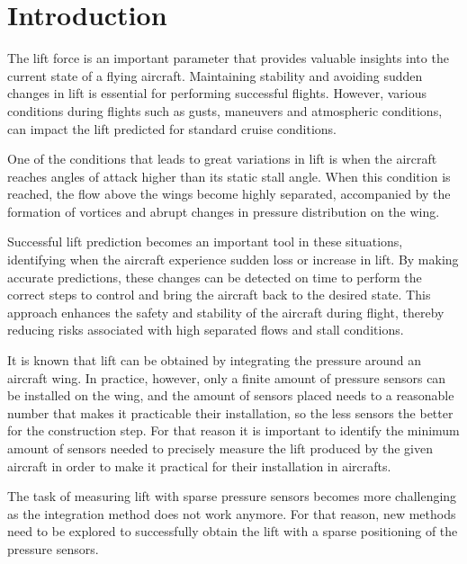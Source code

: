 \documentclass[%
 reprint,
 amsmath,amssymb,
 aps,
]{revtex4-2}
\begin{document}
\maketitle


\section{\label{sec:level1}Introduction}


The lift force is an important parameter that provides valuable insights into the current state of a flying aircraft.
Maintaining stability and avoiding sudden changes in lift is essential for performing successful flights.
However, various conditions during flights such as gusts, maneuvers and atmospheric conditions, can impact the lift predicted for standard cruise conditions.

One of the conditions that leads to great variations in lift is when the aircraft reaches angles of attack higher than its static stall angle.
When this condition is reached, the flow above the wings become highly separated, accompanied by the formation of vortices and abrupt changes in pressure distribution on the wing.

Successful lift prediction becomes an important tool in these situations, identifying when the aircraft experience sudden loss or increase in lift.
By making accurate predictions, these changes can be detected on time to perform the correct steps to control and bring the aircraft back to the desired state.
This approach enhances the safety and stability of the aircraft during flight, thereby reducing risks associated with high separated flows and stall conditions.

It is known that lift can be obtained by integrating the pressure around an aircraft wing.
In practice, however, only a finite amount of pressure sensors can be installed on the wing, and the amount of sensors placed needs to a reasonable number that makes it practicable their installation, so the less sensors the better for the construction step.
For that reason it is important to identify the minimum amount of sensors needed to precisely measure the lift produced by the given aircraft in order to make it practical for their installation in aircrafts.

The task of measuring lift with sparse pressure sensors becomes more challenging as the integration method does not work anymore. 
For that reason, new methods need to be explored to successfully obtain the lift with a sparse positioning of the pressure sensors.
\end{document}
